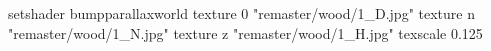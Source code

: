 setshader bumpparallaxworld
    texture 0 "remaster/wood/1_D.jpg"
    texture n "remaster/wood/1_N.jpg"
    texture z "remaster/wood/1_H.jpg"
    texscale 0.125